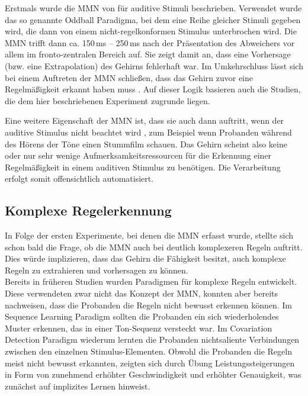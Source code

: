 \documentclass[doc,a4paper,12pt]{apa6}
\begin{document}
Erstmals wurde die MMN von \textcite{naatanen1978early} für auditive Stimuli beschrieben. Verwendet wurde das so genannte Oddball Paradigma, bei dem eine Reihe gleicher Stimuli gegeben wird, die dann von einem nicht-regelkonformen Stimulus unterbrochen wird. Die MMN trifft dann ca. 150\,ms – 250\,ms nach der Präsentation des Abweichers vor allem im fronto-zentralen Bereich auf. Sie zeigt damit an, dass eine Vorhersage (bzw. eine Extrapolation) des Gehirns fehlerhaft war. Im Umkehrschluss lässt sich bei einem Auftreten der MMN schließen, dass das Gehirn zuvor eine Regelmäßigkeit erkannt haben muss \parencite{schroger2007mismatch}. Auf dieser Logik basieren auch die Studien, die dem hier beschriebenen Experiment zugrunde liegen.

Eine weitere Eigenschaft der MMN ist, dass sie auch dann auftritt, wenn der auditive Stimulus nicht beachtet wird \parencite{naatanen2007mismatch}, zum Beispiel wenn Probanden während des Hörens der Töne einen Stummfilm schauen. Das Gehirn scheint also keine oder nur sehr wenige Aufmerksamkeitsressourcen für die Erkennung einer Regelmäßigkeit in einem auditiven Stimulus zu benötigen. Die Verarbeitung erfolgt somit offensichtlich automatisiert.

\subsection{Komplexe Regelerkennung}

In Folge der ersten Experimente, bei denen die MMN erfasst wurde, stellte sich schon bald die Frage, ob die MMN auch bei deutlich komplexeren Regeln auftritt. Dies würde implizieren, dass das Gehirn die Fähigkeit besitzt, auch komplexe Regeln zu extrahieren und vorhersagen zu können.\\
Bereits in früheren Studien wurden Paradigmen für komplexe Regeln entwickelt. Diese verwendeten zwar nicht das Konzept der MMN, konnten aber bereits nachweisen, dass die Probanden die Regeln nicht bewusst erkennen können. Im Sequence Learning Paradigm \parencite{hoffmann1998implicit} sollten die Probanden ein sich wiederholendes Muster erkennen, das in einer Ton-Sequenz versteckt war. Im Covariation Detection Paradigm \parencite{stamov2001revealing} wiederum lernten die Probanden nichtsaliente Verbindungen zwischen den einzelnen Stimulus-Elementen. Obwohl die Probanden die Regeln meist nicht bewusst erkannten, zeigten sich durch Übung Leistungssteigerungen in Form von zunehmend erhöhter Geschwindigkeit und erhöhter Genauigkeit, was zunächst auf implizites Lernen hinweist.
\end{document}
